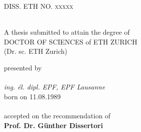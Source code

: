 
\begin{titlepage}

\newcommand{\HRule}{\rule{\linewidth}{0.5mm}} %

\center %
 

\textsc{\LARGE DISS. ETH NO. xxxxx}\\[1.5cm] %

\vspace{2cm}
{ \huge \bfseries \thesistitle}\\[0.4cm] %
\vspace{2cm}

{\large A thesis submitted to attain the degree of} \\ \vspace{0.5cm}
{\Large DOCTOR OF SCIENCES of ETH ZURICH}\\ \vspace{0.3cm}
{\Large (Dr. sc. ETH Zurich)} \vspace{1.5cm}


{\large presented by} \\ \vspace{0.3cm}
{\Large \thesisauthor}\\ \vspace{1cm}
{\Large \textit{ing. \'{e}l. dipl. EPF, EPF Lausanne}}\\ \vspace{1cm}
{\Large born on 11.08.1989} \\
{\Large \thesistown}\\ \vspace{2cm}
{\large accepted on the recommendation of} \\ \vspace{0.5cm}
{\Large \textbf{Prof. Dr. G\"{u}nther Dissertori}} \\ \vspace{2cm}


\end{titlepage}
